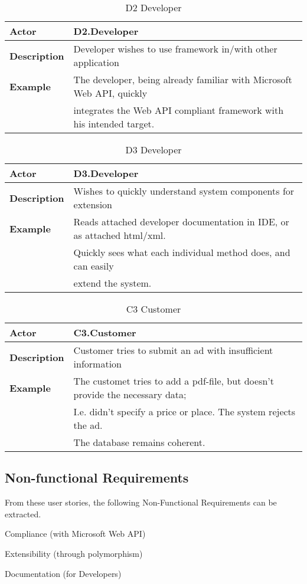 \begin{table}[H]
\begin{tabular}{| l | l |}
	\hline
	\textbf{Actor} & D2.Developer \\
	\hline
	\textbf{Description} & Developer wishes to use framework in/with other application \\
	\hline
	\textbf{Example} & The developer, being already familiar with Microsoft Web API, quickly \\
	& integrates the Web API compliant framework with his intended target.\\
	\hline
\end{tabular}
\caption{D2 Developer}
\end{table}

\begin{table}[H]
\begin{tabular}{| l | l |}
	\hline
	\textbf{Actor} & D3.Developer \\
	\hline
	\textbf{Description} & Wishes to quickly understand system components for extension \\
	\hline
	\textbf{Example} & Reads attached developer documentation in IDE, or as attached html/xml.\\
	& Quickly sees what each individual method does, and can easily \\
	& extend the system.\\
	\hline
\end{tabular}
\caption{D3 Developer}
\end{table}

\begin{table}[H]
\begin{tabular}{| l | l |}
	\hline
	\textbf{Actor} & C3.Customer \\
	\hline
	\textbf{Description} & Customer tries to submit an ad with insufficient information \\
	\hline
	\textbf{Example} & The customet tries to add a pdf-file, but doesn't provide the necessary data;\\
	& I.e. didn't specify a price or place. The system rejects the ad.\\
	& The database remains coherent.\\
	\hline
\end{tabular}
\caption{C3 Customer}
\end{table}

\subsection{Non-functional Requirements}

From these user stories, the following Non-Functional Requirements can be extracted. 

\itemize
\item Compliance (with Microsoft Web API)
\item Extensibility (through polymorphism)
\item Documentation (for Developers)